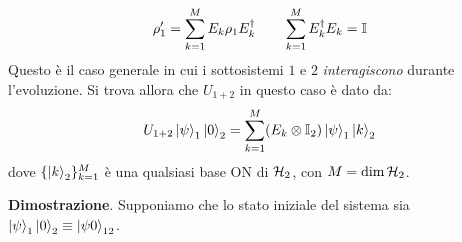 \documentclass[../../InformazioneQuantistica.tex]{subfiles}
\begin{document}
\begin{itemize}
\begin{align}
\rho_1' = \sum_{k=1}^M E_k \rho_1 E_k^\dag \qquad \sum_{k=1}^M E_k^\dag E_k = \mathbb{I}
\label{eqn:def-kraus}
\end{align}
Questo è il caso generale in cui i sottosistemi $1$ e $2$ \textit{interagiscono} durante l'evoluzione. Si trova allora che $U_{1+2}$ in questo caso è dato da:
\begin{align}
U_{1+2}\Ket{\psi}_1 \Ket{0}_2 = \sum_{k=1}^M (E_k \otimes \mathbb{I}_2) \Ket{\psi}_1 \Ket{k}_2
\label{eqn:U-def}
\end{align}
dove $\{\Ket{k}_2\}_{k=1}^M$ è una qualsiasi base ON di $\mathcal{H}_{2}$, con $M=\operatorname{dim}\mathcal{H}_2$.
\end{itemize}

\textbf{Dimostrazione}. Supponiamo che lo stato iniziale del sistema sia $\Ket{\psi}_1\Ket{0}_2 \equiv \Ket{\psi 0}_{12}$.
\end{document}
